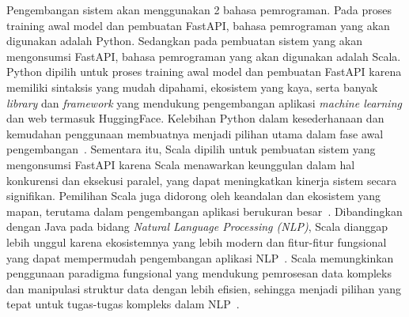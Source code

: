 Pengembangan sistem akan menggunakan 2 bahasa pemrograman. 
Pada proses training awal model dan pembuatan FastAPI, bahasa 
pemrograman yang akan digunakan adalah Python. Sedangkan pada 
pembuatan sistem yang akan mengonsumsi FastAPI, bahasa 
pemrograman yang akan digunakan adalah Scala. Python dipilih 
untuk proses training awal model dan pembuatan FastAPI karena 
memiliki sintaksis yang mudah dipahami, ekosistem yang kaya, 
serta banyak \emph{library} dan \emph{framework} yang 
mendukung pengembangan aplikasi \emph{machine learning} dan 
web termasuk HuggingFace. Kelebihan Python dalam kesederhanaan 
dan kemudahan penggunaan membuatnya menjadi pilihan utama dalam 
fase awal pengembangan~\cite{sharma2020}. Sementara itu, 
Scala dipilih untuk pembuatan sistem yang mengonsumsi FastAPI 
karena Scala menawarkan keunggulan dalam hal konkurensi dan 
eksekusi paralel, yang dapat meningkatkan kinerja sistem secara 
signifikan. Pemilihan Scala juga didorong oleh keandalan dan 
ekosistem yang mapan, terutama dalam pengembangan aplikasi 
berukuran besar~\cite{laddad2020}. Dibandingkan dengan Java 
pada bidang \emph{Natural Language Processing (NLP)}, Scala 
dianggap lebih unggul karena ekosistemnya yang lebih modern 
dan fitur-fitur fungsional yang dapat mempermudah pengembangan 
aplikasi NLP~\cite{pankratius2012}. Scala memungkinkan 
penggunaan paradigma fungsional yang mendukung pemrosesan 
data kompleks dan manipulasi struktur data dengan lebih 
efisien, sehingga menjadi pilihan yang tepat untuk tugas-tugas 
kompleks dalam NLP~\cite{papadimitriou2011}.
